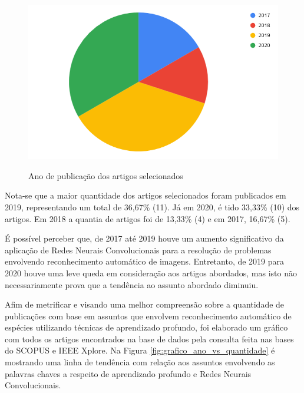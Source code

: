 \documentclass[
	12pt,				%
	oneside,			%
	a4paper,			%
	english,			%
	brazil				%
	]{abntex2ppgsi}
\begin{document}
\begin{figure}[H]
    \centering
    \caption{Ano de publicação dos artigos selecionados}
    \includegraphics[scale=.60]{imagens/grafico_ano_vs_publicacao.png}
    \label{fig:grafico_ano_vs_publicacao}
\end{figure}

Nota-se que a maior quantidade dos artigos selecionados foram publicados em 2019, representando um total de 36,67\% (11). Já em 2020, é tido 33,33\% (10) dos artigos. Em 2018 a quantia de artigos foi de 13,33\% (4) e em 2017, 16,67\% (5).

É possível perceber que, de 2017 até 2019 houve um aumento significativo da aplicação de Redes Neurais Convolucionais para a resolução de problemas envolvendo reconhecimento automático de imagens. Entretanto, de 2019 para 2020 houve uma leve queda em consideração aos artigos abordados, mas isto não necessariamente prova que a tendência ao assunto abordado diminuiu. 

Afim de metrificar e visando uma melhor compreensão sobre a quantidade de publicações com base em assuntos que envolvem reconhecimento automático de espécies utilizando técnicas de aprendizado profundo, foi elaborado um gráfico com todos os artigos encontrados na base de dados pela consulta feita nas bases do SCOPUS e IEEE Xplore. Na Figura \ref{fig:grafico_ano_vs_quantidade} é mostrando uma linha de tendência com relação aos assuntos envolvendo as palavras chaves a respeito de aprendizado profundo e Redes Neurais Convolucionais.
\end{document}
